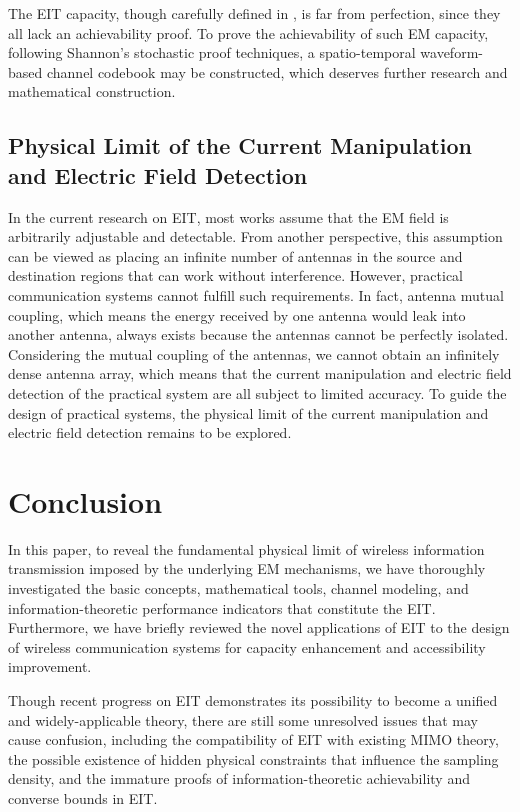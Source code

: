 \documentclass[journal,twocolumn]{IEEEtran}
\begin{document}
The EIT capacity, though carefully defined in \cite{wan2022mutual,zhang2022pdma}, is far from perfection, since they all lack an achievability proof. 
To prove the achievability of such EM capacity, following Shannon's stochastic proof techniques, a spatio-temporal waveform-based channel codebook may be constructed, which deserves further research and mathematical construction.  

\subsection{Physical Limit of the Current Manipulation and Electric Field Detection}
In the current research on EIT, most works assume that the EM field is arbitrarily adjustable and detectable. From another perspective, this assumption can be viewed as placing an infinite number of antennas in the source and destination regions that can work without interference. However, practical communication systems cannot fulfill such requirements. In fact, antenna mutual coupling, which means the energy received by one antenna would leak into another antenna, always exists because the antennas cannot be perfectly isolated. Considering the mutual coupling of the antennas, we cannot obtain an infinitely dense antenna array, which means that the current manipulation and electric field detection of the practical system are all subject to limited accuracy. To guide the design of practical systems, the physical limit of the current manipulation and electric field detection remains to be explored. 

\section{Conclusion}
In this paper, to reveal the fundamental physical limit of wireless information transmission imposed by the underlying EM mechanisms, we have thoroughly investigated the basic concepts, mathematical tools, channel modeling, and information-theoretic performance indicators that constitute the EIT. 
Furthermore, we have briefly reviewed the novel applications of EIT to the design of wireless communication systems for capacity enhancement and accessibility improvement. 

Though recent progress on EIT demonstrates its possibility to become a unified and widely-applicable theory, there are still some unresolved issues that may cause confusion, including the compatibility of EIT with existing MIMO theory, the possible existence of hidden physical constraints that influence the sampling density, and the immature proofs of information-theoretic achievability and converse bounds in EIT. 
\end{document}
